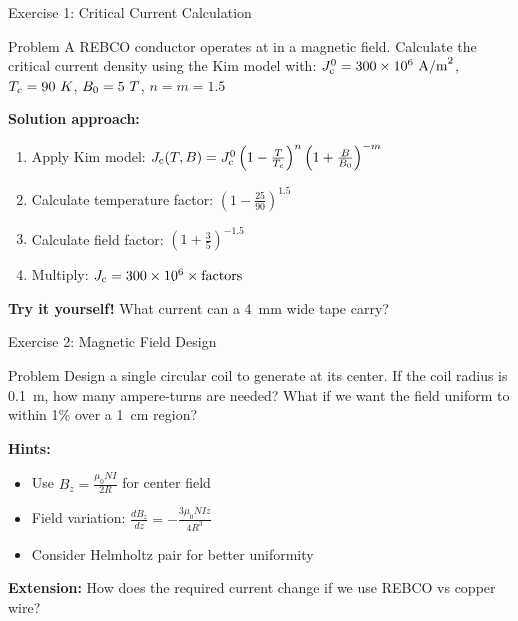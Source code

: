 \begin{frame}{Exercise 1: Critical Current Calculation}
    \begin{block}{Problem}
        A REBCO conductor operates at  in a  magnetic field.
        Calculate the critical current density using the Kim model with:
        $J_\text{c}^0 = 300 \times 10^6~\text{A/m}^2$, $T_c = 90~K$, $B_0 = 5~T$, $n = m = 1.5$
    \end{block}
    
    \vspace{0.5cm}
    \textbf{Solution approach:}
    \begin{enumerate}
        \item Apply Kim model: $J_\text{c}(T,B) = J_\text{c}^0 \left(1-\frac{T}{T_c}\right)^{n} \left(1+\frac{B}{B_0}\right)^{-m}$
        \item Calculate temperature factor: $\left(1-\frac{25}{90}\right)^{1.5}$
        \item Calculate field factor: $\left(1+\frac{3}{5}\right)^{-1.5}$
        \item Multiply: $J_\text{c} = 300 \times 10^6 \times \text{factors}$
    \end{enumerate}
    
    \vspace{0.3cm}
    \textbf{Try it yourself!} What current can a 4~mm wide tape carry?
\end{frame}

\begin{frame}{Exercise 2: Magnetic Field Design}
    \begin{block}{Problem}
        Design a single circular coil to generate  at its center.
        If the coil radius is 0.1~m, how many ampere-turns are needed?
        What if we want the field uniform to within 1\% over a 1~cm region?
    \end{block}
    
    \vspace{0.3cm}
    \textbf{Hints:}
    \begin{itemize}
        \item Use $B_z = \frac{\mu_0 N I}{2 R}$ for center field
        \item Field variation: $\frac{dB_z}{dz} = -\frac{3\mu_0 N I z}{4 R^3}$
        \item Consider Helmholtz pair for better uniformity
    \end{itemize}
    
    \vspace{0.3cm}
    \textbf{Extension:} How does the required current change if we use REBCO vs copper wire?
\end{frame}

